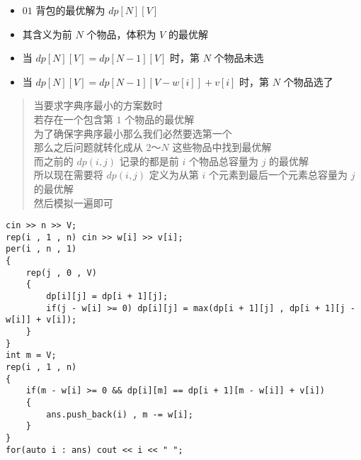 \documentclass[E:/GsjzTle/main/main.tex]{subfiles}
\begin{document}
\begin{itemize}
\item
  \(01\) 背包的最优解为 \(dp[N][V]\)
\item
  其含义为前 \(N\) 个物品，体积为 \(V\) 的最优解
\item
  当 \(dp[N][V] = dp[N - 1][V]\) 时，第 \(N\) 个物品未选
\item
  当 \(dp[N][V] = dp[N - 1][V - w[i]] + v[i]\) 时，第 \(N\) 个物品选了
\end{itemize}

\begin{quote}
当要求字典序最小的方案数时\\
若存在一个包含第 \(1\) 个物品的最优解\\
为了确保字典序最小那么我们必然要选第一个\\
那么之后问题就转化成从 \(2\)～\(N\) 这些物品中找到最优解\\
而之前的 \(dp(i,j)\) 记录的都是前 \(i\) 个物品总容量为 \(j\) 的最优解\\
所以现在需要将 \(dp(i,j)\) 定义为从第 \(i\) 个元素到最后一个元素总容量为
\(j\) 的最优解\\
然后模拟一遍即可
\end{quote}

\begin{lstlisting}
cin >> n >> V;
rep(i , 1 , n) cin >> w[i] >> v[i];
per(i , n , 1)
{
	rep(j , 0 , V)
	{
		dp[i][j] = dp[i + 1][j];
		if(j - w[i] >= 0) dp[i][j] = max(dp[i + 1][j] , dp[i + 1][j - w[i]] + v[i]);
	}	
}
int m = V;
rep(i , 1 , n)
{
	if(m - w[i] >= 0 && dp[i][m] == dp[i + 1][m - w[i]] + v[i])
	{
		ans.push_back(i) , m -= w[i];
	}
}
for(auto i : ans) cout << i << " ";
\end{lstlisting}
\end{document}
